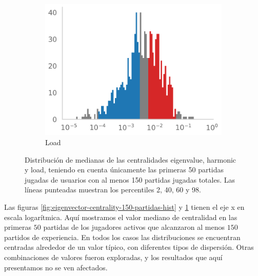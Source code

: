 \documentclass[a4paper,11pt]{book}
\theoremstyle{definition}
\begin{document}
\begin{figure}[ht!]
\begin{subfigure}[t]{0.32\textwidth}
	\includegraphics[width=\linewidth]{static/paper/load-centrality-150-partidas-hist}
	\caption{Load}
	\label{fig:load-centrality-150-partidas-hist}
	\end{subfigure}
	\caption{
	Distribución de medianas de las centralidades eigenvalue, harmonic y load, teniendo en cuenta únicamente las primeras 50 partidas jugadas de usuarios con al menos 150 partidas jugadas totales. Las líneas punteadas muestran los percentiles 2, 40, 60 y 98.
	}
	\label{Figuras.HistogramasCentralidades}
 \end{figure}
%
Las figuras \ref{fig:eigenvector-centrality-150-partidas-hist} y \ref{fig:load-centrality-150-partidas-hist} tienen el eje x en escala logarítmica.
%
Aquí mostramos el valor mediano de centralidad en las primeras $50$ partidas de los jugadores activos que alcanzaron al menos $150$ partidos de experiencia.
%
En todos los casos las distribuciones se encuentran centradas alrededor de un valor típico, con diferentes tipos de dispersión.
%
Otras combinaciones de valores fueron exploradas, y los resultados que aquí presentamos no se ven afectados.
%
\end{document}

